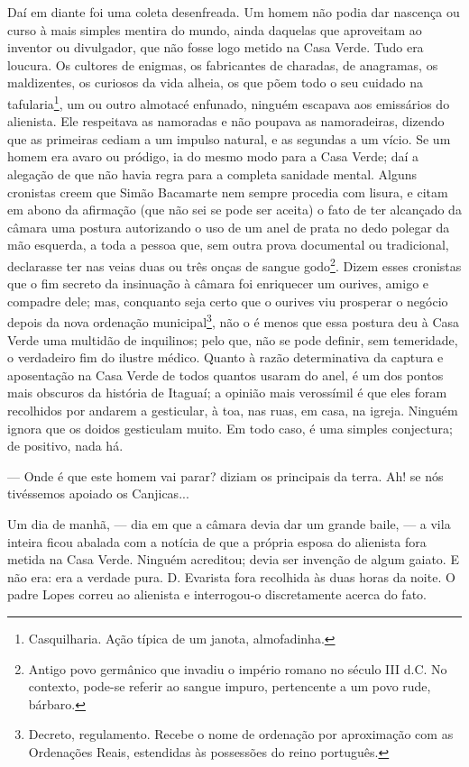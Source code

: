 Daí em diante foi uma coleta desenfreada. Um homem não podia dar
nascença ou curso à mais simples mentira do mundo, ainda daquelas que
aproveitam ao inventor ou divulgador, que não fosse logo metido na Casa
Verde. Tudo era loucura. Os cultores de enigmas, os fabricantes de
charadas, de anagramas, os maldizentes, os curiosos da vida alheia, os
que põem todo o seu cuidado na tafularia\footnote{Casquilharia. Ação
  típica de um janota, almofadinha.}, um ou outro almotacé enfunado,
ninguém escapava aos emissários do alienista. Ele respeitava as
namoradas e não poupava as namoradeiras, dizendo que as primeiras cediam
a um impulso natural, e as segundas a um vício. Se um homem era avaro ou
pródigo, ia do mesmo modo para a Casa Verde; daí a alegação de que não
havia regra para a completa sanidade mental. Alguns cronistas creem que
Simão Bacamarte nem sempre procedia com lisura, e citam em abono da
afirmação (que não sei se pode ser aceita) o fato de ter alcançado da
câmara uma postura autorizando o uso de um anel de prata no dedo polegar
da mão esquerda, a toda a pessoa que, sem outra prova documental ou
tradicional, declarasse ter nas veias duas ou três onças de sangue
godo\footnote{Antigo povo germânico que invadiu o império romano no
  século III d.C. No contexto, pode-se referir ao sangue impuro,
  pertencente a um povo rude, bárbaro.}. Dizem esses cronistas que o fim
secreto da insinuação à câmara foi enriquecer um ourives, amigo e
compadre dele; mas, conquanto seja certo que o ourives viu prosperar o
negócio depois da nova ordenação municipal\footnote{Decreto,
  regulamento. Recebe o nome de ordenação por aproximação com as
  Ordenações Reais, estendidas às possessões do reino português.}, não o
é menos que essa postura deu à Casa Verde uma multidão de inquilinos;
pelo que, não se pode definir, sem temeridade, o verdadeiro fim do
ilustre médico. Quanto à razão determinativa da captura e aposentação na
Casa Verde de todos quantos usaram do anel, é um dos pontos mais
obscuros da história de Itaguaí; a opinião mais verossímil é que eles
foram recolhidos por andarem a gesticular, à toa, nas ruas, em casa, na
igreja. Ninguém ignora que os doidos gesticulam muito. Em todo caso, é
uma simples conjectura; de positivo, nada há.

--- Onde é que este homem vai parar? diziam os principais da terra. Ah!
se nós tivéssemos apoiado os Canjicas...

Um dia de manhã, --- dia em que a câmara devia dar um grande baile, ---
a vila inteira ficou abalada com a notícia de que a própria esposa do
alienista fora metida na Casa Verde. Ninguém acreditou; devia ser
invenção de algum gaiato. E não era: era a verdade pura. D. Evarista
fora recolhida às duas horas da noite. O padre Lopes correu ao alienista
e interrogou-o discretamente acerca do fato.

